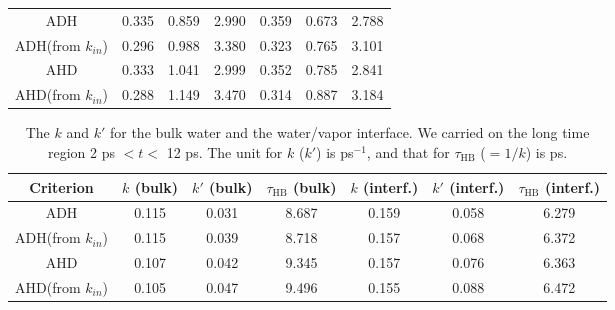 {\begin{table}[htb]
\begin{tabular}{ccccccc}
\hline
  ADH & 0.335 & 0.859 & 2.990 & 0.359 & 0.673 & 2.788  \\
  ADH(from $k_{in}$) & 0.296  & 0.988 & 3.380  & 0.323 & 0.765 & 3.101 \\
  AHD & 0.333 & 1.041 & 2.999 & 0.352  & 0.785  &  2.841\\
  AHD(from $k_{in}$) & 0.288 & 1.149 & 3.470 & 0.314 & 0.887 & 3.184 \\
\end{tabular}
\end{table}
%
\begin{table}[htb]
\centering
\caption{\label{tab:k_k_prime_128w_pure_2} 
    The $k$ and $k'$ for the bulk water and the water/vapor interface. We carried on the long time region 2 ps $< t <$ 12 ps. 
The unit for $k$ ($k'$) is ps$^{-1}$, and that for $\tau_{\text{HB}}$ ($=1/k$) is ps.} 
\begin{tabular}{ccccccc}
 Criterion & $k$  (bulk) & $k'$ (bulk) & $\tau_{\text{HB}}$ (bulk) & $k$  (interf.) & $k'$ (interf.) & $\tau_{\text{HB}}$ (interf.)\\
\hline
  ADH & 0.115 & 0.031 & 8.687 & 0.159 & 0.058 & 6.279 \\
  ADH(from $k_{in}$) & 0.115  & 0.039 & 8.718 & 0.157  & 0.068 & 6.372\\
  AHD & 0.107 & 0.042 & 9.345  & 0.157 & 0.076 & 6.363 \\
  AHD(from $k_{in}$) & 0.105  & 0.047 & 9.496 & 0.155  & 0.088 & 6.472 \\
\end{tabular}
\end{table}
% 

}
